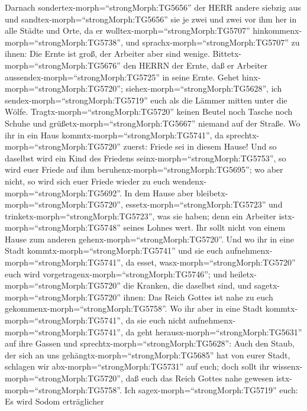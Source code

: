 Darnach sondertex-morph=``strongMorph:TG5656'' der HERR
andere siebzig aus und sandtex-morph=``strongMorph:TG5656'' sie je zwei
und zwei vor ihm her in alle Städte und Orte, da er
wolltex-morph=``strongMorph:TG5707''
hinkommenx-morph=``strongMorph:TG5738'',  und
sprachx-morph=``strongMorph:TG5707'' zu ihnen: Die Ernte ist groß, der
Arbeiter aber sind wenige. Bittetx-morph=``strongMorph:TG5676'' den
HERRN der Ernte, daß er Arbeiter aussendex-morph=``strongMorph:TG5725''
in seine Ernte.  Gehet hinx-morph=``strongMorph:TG5720'';
siehex-morph=``strongMorph:TG5628'', ich
sendex-morph=``strongMorph:TG5719'' euch als die Lämmer mitten unter die
Wölfe.  Tragtx-morph=``strongMorph:TG5720'' keinen Beutel
noch Tasche noch Schuhe und grüßetx-morph=``strongMorph:TG5667'' niemand
auf der Straße.  Wo ihr in ein Haus
kommtx-morph=``strongMorph:TG5741'', da
sprechtx-morph=``strongMorph:TG5720'' zuerst: Friede sei in diesem
Hause!  Und so daselbst wird ein Kind des Friedens
seinx-morph=``strongMorph:TG5753'', so wird euer Friede auf ihm
beruhenx-morph=``strongMorph:TG5695''; wo aber nicht, so wird sich euer
Friede wieder zu euch wendenx-morph=``strongMorph:TG5692''. 
In dem Hause aber bleibetx-morph=``strongMorph:TG5720'',
essetx-morph=``strongMorph:TG5723'' und
trinketx-morph=``strongMorph:TG5723'', was sie haben; denn ein Arbeiter
istx-morph=``strongMorph:TG5748'' seines Lohnes wert. Ihr sollt nicht
von einem Hause zum anderen gehenx-morph=``strongMorph:TG5720''.
 Und wo ihr in eine Stadt
kommtx-morph=``strongMorph:TG5741'' und sie euch
aufnehmenx-morph=``strongMorph:TG5741'', da esset,
wasx-morph=``strongMorph:TG5720'' euch wird
vorgetragenx-morph=``strongMorph:TG5746'';  und
heiletx-morph=``strongMorph:TG5720'' die Kranken, die daselbst sind, und
sagetx-morph=``strongMorph:TG5720'' ihnen: Das Reich Gottes ist nahe zu
euch gekommenx-morph=``strongMorph:TG5758''.  Wo ihr aber
in eine Stadt kommtx-morph=``strongMorph:TG5741'', da sie euch nicht
aufnehmenx-morph=``strongMorph:TG5741'', da geht
herausx-morph=``strongMorph:TG5631'' auf ihre Gassen und
sprechtx-morph=``strongMorph:TG5628'':  Auch den Staub, der
sich an uns gehängtx-morph=``strongMorph:TG5685'' hat von eurer Stadt,
schlagen wir abx-morph=``strongMorph:TG5731'' auf euch; doch sollt ihr
wissenx-morph=``strongMorph:TG5720'', daß euch das Reich Gottes nahe
gewesen istx-morph=``strongMorph:TG5758''.  Ich
sagex-morph=``strongMorph:TG5719'' euch: Es wird Sodom erträglicher
